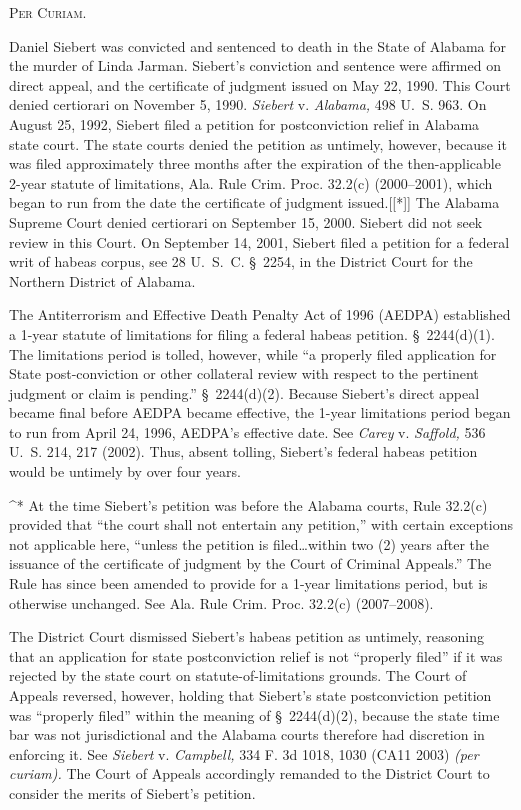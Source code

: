 
\setcounter{page}{4}

  \textsc{Per Curiam.}

  Daniel Siebert was convicted and sentenced to death in the State of
Alabama for the murder of Linda Jarman. Siebert's conviction and
sentence were affirmed on direct appeal, and the certificate of judgment
issued on May 22, 1990. This Court denied certiorari on November 5,
1990. \emph{Siebert} v. \emph{Alabama,} 498 U.~S. 963. On August 25,
1992, Siebert filed a petition for postconviction relief in Alabama
state court. The state courts denied the petition as untimely, however,
because it was filed approximately three months after the expiration of
the then-applicable 2-year statute of limitations, Ala. Rule Crim.
Proc. 32.2(c) (2000--2001), which began to run from the date the
certificate of judgment issued.[[*]] The Alabama Supreme Court denied
certiorari on September 15, 2000. Siebert did not seek review in this
Court. On September 14, 2001, Siebert filed a petition for a federal
writ of habeas corpus, see 28 U.~S.~C. \S~2254, in the District
Court for the Northern District of Alabama.

  The Antiterrorism and Effective Death Penalty Act of 1996 (AEDPA)
established a 1-year statute of limitations for filing a federal habeas
petition. \S~2244(d)(1). The limitations period is tolled, however,
while ``a properly filed application for State post-conviction or other
collateral review with respect to the pertinent judgment or claim is
pending.'' \S~2244(d)(2). Because Siebert's direct appeal became
final before AEDPA became effective, the 1-year limitations period began
to run from April 24, 1996, AEDPA's effective date. See \emph{Carey} v.
\emph{Saffold,} 536 U.~S. 214, 217 (2002). Thus, \newpage  absent tolling,
Siebert's federal habeas petition would be untimely by over four
years.

^* At the time Siebert's petition was before the Alabama courts, Rule
32.2(c) provided that ``the court shall not entertain any petition,''
with certain exceptions not applicable here, ``unless the petition is
filed\dots within two (2) years after the issuance of the certificate
of judgment by the Court of Criminal Appeals.'' The Rule has since been
amended to provide for a 1-year limitations period, but is otherwise
unchanged. See Ala. Rule Crim. Proc. 32.2(c) (2007--2008).

  The District Court dismissed Siebert's habeas petition as untimely,
reasoning that an application for state postconviction relief is
not ``properly filed'' if it was rejected by the state court on
statute-of-limitations grounds. The Court of Appeals reversed, however,
holding that Siebert's state postconviction petition was ``properly
filed'' within the meaning of \S~2244(d)(2), because the state
time bar was not jurisdictional and the Alabama courts therefore had
discretion in enforcing it. See \emph{Siebert} v. \emph{Campbell,} 334 F.
3d 1018, 1030 (CA11 2003) \emph{(per curiam).} The Court of Appeals
accordingly remanded to the District Court to consider the merits of
Siebert's petition.

